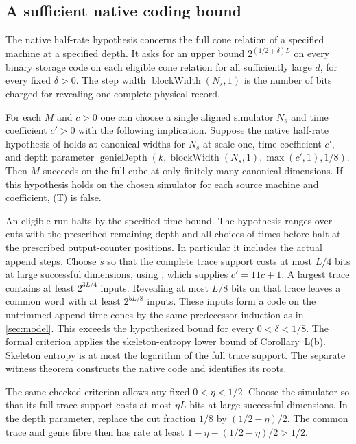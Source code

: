 \subsection{A sufficient native coding bound}\label{sec:native-test}

The native half-rate hypothesis concerns the full cone relation of a
specified machine at a specified depth. It asks for an upper bound
$2^{(1/2+\delta)L}$ on every binary storage code on each eligible cone
relation for all sufficiently large $d$, for every fixed $\delta>0$.
The step width $\operatorname{blockWidth}(N_s,1)$ is the number of bits
charged for revealing one complete physical record.

\begin{corollary}\label{cor:native}
For each $M$ and $c>0$ one can choose a single aligned simulator $N_s$ and
time coefficient $c'>0$ with the following implication. Suppose the
native half-rate hypothesis of \cite[Corollary L(b)]{PaperFourteen}
holds at canonical widths for $N_s$ at scale one, time coefficient
$c'$, and depth parameter $\operatorname{genieDepth}
(k,\operatorname{blockWidth}(N_s,1),\max(c',1),1/8)$. Then $M$
succeeds on the full cube at only finitely many canonical dimensions.
If this hypothesis holds on the chosen simulator for each source machine
and coefficient, \textnormal{(T)} is false.
\end{corollary}
\begin{outline}
An eligible run halts by the specified time bound. The hypothesis
ranges over cuts with the prescribed
remaining depth and all choices of times before halt at the prescribed
output-counter positions. In particular it includes the actual append
steps. Choose $s$ so that the complete trace support costs at most $L/4$
bits at large successful dimensions, using
, which supplies
$c'=11c+1$. A largest trace
contains at least $2^{3L/4}$ inputs. Revealing at most $L/8$ bits on
that trace leaves a common word with at least $2^{5L/8}$ inputs. These
inputs form a code on the untrimmed append-time cones by the same
predecessor induction as in \cref{sec:model}. This exceeds the hypothesized
bound for every $0<\delta<1/8$. The formal criterion applies the skeleton-entropy lower bound of
Corollary~L(b). Skeleton entropy is at most the logarithm of the full
trace support. The separate witness theorem
 constructs the native code
and 
identifies its roots.
\end{outline}

The same checked criterion allows any fixed $0<\eta<1/2$. Choose the
simulator so that its full trace support costs at most $\eta L$ bits
at large successful dimensions. In the depth parameter, replace the
cut fraction $1/8$ by $(1/2-\eta)/2$. The common trace and genie fibre
then has rate at least $1-\eta-(1/2-\eta)/2>1/2$.
